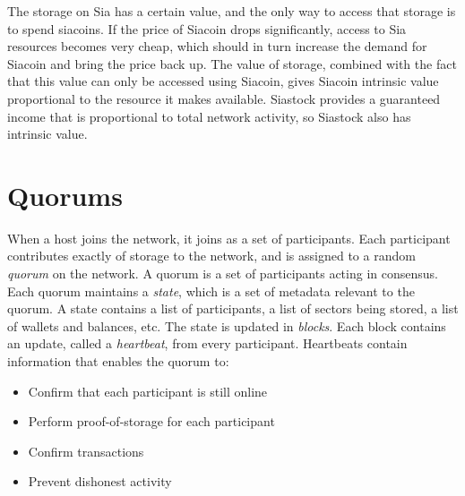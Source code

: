 \documentclass[twocolumn]{article}
\begin{document}
The storage on Sia has a certain value, and the only way to access that storage is to spend siacoins.
If the price of Siacoin drops significantly, access to Sia resources becomes very cheap, which should in turn increase the demand for Siacoin and bring the price back up.
The value of storage, combined with the fact that this value can only be accessed using Siacoin, gives Siacoin intrinsic value proportional to the resource it makes available.
Siastock provides a guaranteed income that is proportional to total network activity, so Siastock also has intrinsic value.


\section{Quorums}
When a host joins the network, it joins as a set of participants.
Each participant contributes exactly \participantvolume{} of storage to the network, and is assigned to a random \textit{quorum} on the network.
A quorum is a set of \quorumsize{} participants acting in consensus.
Each quorum maintains a \textit{state}, which is a set of metadata relevant to the quorum.
A state contains a list of participants, a list of sectors being stored, a list of wallets and balances, etc.
The state is updated in \textit{blocks}.
Each block contains an update, called a \textit{heartbeat}, from every participant.
Heartbeats contain information that enables the quorum to:
\begin{itemize}
	\item Confirm that each participant is still online
	\item Perform proof-of-storage for each participant
	\item Confirm transactions
	\item Prevent dishonest activity
\end{itemize}
\end{document}
